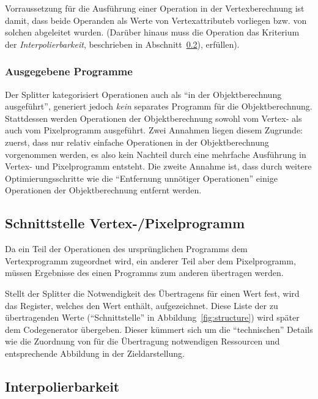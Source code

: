 \documentclass[twoside,a4paper,fleqn,12pt]{book}
\begin{document}
Vorraussetzung für die Ausführung einer Operation in der Vertexberechnung ist damit, dass beide Operanden als Werte von Vertexattributeb vorliegen
bzw. von solchen abgeleitet wurden.
(Darüber hinaus muss die Operation das Kriterium der \emph{Interpolierbarkeit}, beschrieben in Abschnitt~\ref{Interpolierbarkeit}), erfüllen).

\subsubsection{Ausgegebene Programme}
Der Splitter kategorisiert Operationen auch als "`in der Objektberechnung ausgeführt"', generiert jedoch \emph{kein} separates Programm
für die Objektberechnung.
Stattdessen werden Operationen der Objektberechnung sowohl vom Vertex- als auch vom Pixelprogramm ausgeführt. Zwei Annahmen
liegen diesem Zugrunde: zuerst, dass nur relativ einfache Operationen in der Objektberechnung vorgenommen werden, es also kein
Nachteil durch eine mehrfache Ausführung in Vertex- und Pixelprogramm entsteht. Die zweite Annahme ist,
dass durch weitere Optimierungsschritte wie die "`Entfernung unnötiger Operationen"' einige Operationen der Objektberechnung entfernt werden.


\subsection{Schnittstelle Vertex-/Pixelprogramm}
\label{schnittstelle}

Da ein Teil der Operationen des ursprünglichen Programms dem Vertexprogramm zugeordnet wird, ein anderer Teil aber dem
Pixelprogramm, müssen Ergebnisse des einen Programms zum anderen übertragen werden.

Stellt der Splitter die Notwendigkeit des Übertragens für einen Wert fest, wird das Register, welches den Wert enthält, aufgezeichnet.
Diese Liste der zu übertragenden Werte ("`Schnittstelle"' in Abbildung~\ref{fig:structure}) wird später dem Codegenerator übergeben.
Dieser kümmert sich um die "`technischen"' Details wie die Zuordnung von für die Übertragung notwendigen Ressourcen und %
entsprechende Abbildung in der Zieldarstellung.

\subsection{Interpolierbarkeit}
\label{Interpolierbarkeit}
\end{document}
